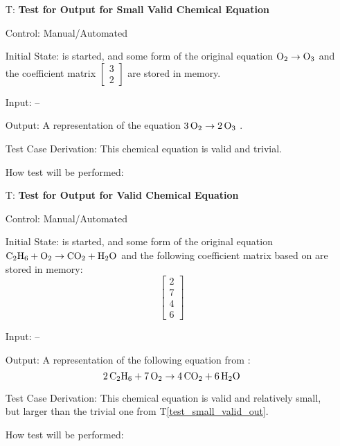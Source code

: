 \documentclass[12pt, titlepage]{article}
\newcounter{testnum} %
\newcommand{\testref}[1]{T\ref{#1}}
\begin{document}
\begin{enumerate}

  \item[T\refstepcounter{testnum}\thetestnum \label{test_small_valid_out}:]
    \textbf{Test for Output for Small Valid Chemical Equation}

    Control: Manual/Automated 

    Initial State: \progname{} is started, and some form of the original
    equation $\ce{O2} \rightarrow \ce{O3}$ and the coefficient matrix
    $\begin{bmatrix}
        3 \\
        2
      \end{bmatrix}$ are stored in memory.

    Input: --

    Output: A representation of the equation $\ce{3O2} \rightarrow \ce{2O3}$
    \cite[p.~6]{fahey_twenty_2011}.

    Test Case Derivation: This chemical equation is valid and trivial.

    How test will be performed: 

  \item[T\refstepcounter{testnum}\thetestnum \label{test_valid_out}:]
    \textbf{Test for Output for Valid Chemical Equation}

    Control: Manual/Automated 

    Initial State: \progname{} is started, and some form of the original
    equation $\ce{C2H6} + \ce{O2} \rightarrow \ce{CO2} + \ce{H2O}$
    \cite{hamid_balancing_2019} and the following coefficient matrix
    based on \cite{hamid_balancing_2019} are stored in memory:
    $$\begin{bmatrix}
        2 \\
        7 \\
        4 \\
        6
      \end{bmatrix}$$

    Input: --

    Output: A representation of the following equation from
    \cite[p.~523]{hamid_balancing_2019}:
    $$\ce{2C2H6} + \ce{7O2} \rightarrow \ce{4CO2} + \ce{6H2O}$$

    Test Case Derivation: This chemical equation is
    valid and relatively small, but larger than the trivial one from
    \testref{test_small_valid_out}.

    How test will be performed: 


\end{enumerate}
\end{document}
